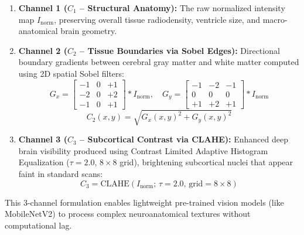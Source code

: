 \documentclass[conference]{IEEEtran}
\begin{document}
\begin{enumerate}
    \item \textbf{Channel 1 ($C_{1}$ -- Structural Anatomy):} The raw normalized intensity map $I_{\text{norm}}$, preserving overall tissue radiodensity, ventricle size, and macro-anatomical brain geometry.
    
    \item \textbf{Channel 2 ($C_{2}$ -- Tissue Boundaries via Sobel Edges):} Directional boundary gradients between cerebral gray matter and white matter computed using 2D spatial Sobel filters:
    \begin{equation}
    G_x = \begin{bmatrix} -1 & 0 & +1 \\ -2 & 0 & +2 \\ -1 & 0 & +1 \end{bmatrix} * I_{\text{norm}}, \quad
    G_y = \begin{bmatrix} -1 & -2 & -1 \\ 0 & 0 & 0 \\ +1 & +2 & +1 \end{bmatrix} * I_{\text{norm}}
    \end{equation}
    \begin{equation}
    C_{2}(x, y) = \sqrt{G_x(x, y)^2 + G_y(x, y)^2}
    \end{equation}
    
    \item \textbf{Channel 3 ($C_{3}$ -- Subcortical Contrast via CLAHE):} Enhanced deep brain visibility produced using Contrast Limited Adaptive Histogram Equalization ($\tau = 2.0$, $8 \times 8$ grid), brightening subcortical nuclei that appear faint in standard scans:
    \begin{equation}
    C_{3} = \text{CLAHE}(I_{\text{norm}}; \, \tau = 2.0, \, \text{grid} = 8 \times 8)
    \end{equation}
\end{enumerate}
This 3-channel formulation enables lightweight pre-trained vision models (like MobileNetV2) to process complex neuroanatomical textures without computational lag.
\end{document}
